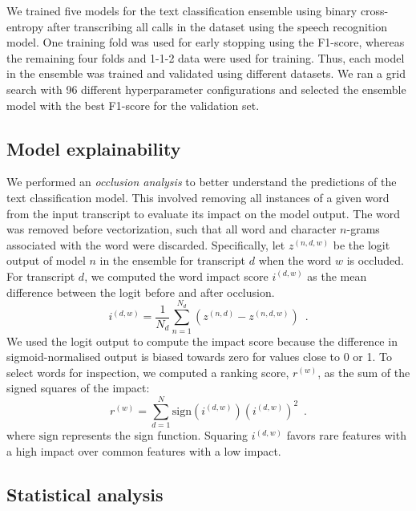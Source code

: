 {We trained five models for the text classification ensemble using binary cross-entropy after transcribing all calls in the dataset using the speech recognition model. One training fold was used for early stopping using the F1-score, whereas the remaining four folds and 1-1-2 data were used for training. Thus, each model in the ensemble was trained and validated using different datasets. We ran a grid search with 96 different hyperparameter configurations and selected the ensemble model with the best F1-score for the validation set. 


\subsection{Model explainability}\label{sec_retrospective:model_explainability}

We performed an \emph{occlusion analysis} to better understand the predictions of the text classification model. This involved removing all instances of a given word from the input transcript to evaluate its impact on the model output. The word was removed before vectorization, such that all word and character $n$-grams associated with the word were discarded. Specifically, let $z^{(n, d, w)}$ be the logit output of model $n$ in the ensemble for transcript $d$ when the word $w$ is occluded. For transcript $d$, we computed the word impact score $i^{(d, w)}$ as the mean difference between the logit before and after occlusion.
%
\begin{equation}
    i^{(d,w)} = \frac{1}{N_d} \sum_{n=1}^{N_d} \left( z^{(n, d)} - z^{(n, d, w)} \right) \enspace .
\end{equation}
%
We used the logit output to compute the impact score because the difference in sigmoid-normalised output is biased towards zero for values close to 0 or 1. To select words for inspection, we computed a ranking score, $r^{(w)}$, as the sum of the signed squares of the impact:
%
\begin{equation}
    r^{(w)} = \sum_{d=1}^{N} \text{sign}\left( i^{(d, w)} \right) \left( i^{(d,w)}\right) ^2 \enspace .
\end{equation}
%
where $\text{sign}$ represents the sign function. Squaring $i^{(d,w)}$ favors rare features with a high impact over common features with a low impact.


\subsection{Statistical analysis}

}
